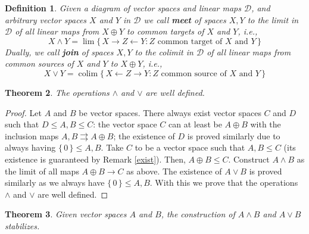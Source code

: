 \documentclass[10pt]{amsart}
\newtheorem{theorem}{Theorem}[section]
\newtheorem{definition}[theorem]{Definition}
\def \DD{{\mathcal D}}
\DeclareMathOperator*{\colim}{colim}
\newcommand{\set}[1]{\{\,#1\,\}}
\newcommand{\from}{\leftarrow}
\newcommand{\meet}{\wedge}
\newcommand{\join}{\vee}
\newcommand\dfn{\textbf}
\begin{document}
\begin{definition}
  Given a diagram of vector spaces and linear maps $\DD$, 
  and arbitrary vector spaces $X$ and $Y$ in $\DD$
  we call \dfn{meet} of spaces $X, Y$ to the limit in $\DD$ 
  of all linear maps from $X\oplus Y$ to common targets of $X$ and $Y$, i.e., 
    \[
  X\meet Y = \lim\set{X\to Z\from Y : 
    Z \text{ common target of $X$ and $Y$}}
  \]
  Dually, we call \dfn{join} of spaces $X, Y$ to the colimit in $\DD$  
  of all linear maps from common sources of $X$ and $Y$ to $X \oplus Y$, i.e., 
    \[
  X\join Y = \colim\set{X\from Z\to Y : 
    Z \text{ common source of $X$ and $Y$}}
  \] 
\end{definition}










\begin{theorem}\label{existence1} 
The operations $\wedge$ and $\vee $ are well defined.
\end{theorem}

\begin{proof}
Let $A$ and $B$ be vector spaces. 
There always exist vector spaces $C$ and $D$ such that $D\leq A,B\leq C$: the vector space $C$ can at least be $A\oplus B$ with the inclusion maps $A, B \rightrightarrows A\oplus B$; the existence of $D$ is proved similarly due to always having $\set{0}\leq A,B$.
Take $C$ to be a vector space such that $A,B\leq C$ (its existence is guaranteed by Remark \ref{exist}). 
Then, $A\oplus B\leq C$. 
Construct $A\wedge B$ as the limit of all maps $A\oplus B\rightarrow C$ as above. 
The existence of $A\vee B$ is proved similarly as we always have $\set{0}\leq A,B$.
With this we prove that the operations $\wedge$ and $\vee $ are well defined.
\end{proof}












\begin{theorem}\label{stabilize}
Given vector spaces $A$ and $B$, the construction of $A\wedge B$ and $A\vee B$ stabilizes.
\end{theorem}
\end{document}
